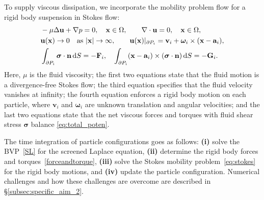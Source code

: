 To supply viscous dissipation, we incorporate the mobility problem
flow for a rigid body suspension in Stokes flow:
\begin{equation}
\label{eq:stokes}
\begin{aligned}
  &-\mu \Delta \mathbf{u} + \nabla p = 0, \quad \mathbf{x} \in \Omega, \qquad 
  \nabla \cdot \mathbf{u} = 0,  \quad \mathbf{x} \in \Omega,\\
  &{\bf u}(\mathbf{x}) \to 0 \quad \text{as}\ |\mathbf{x}|\to \infty,\qquad 
  \mathbf{u}(\mathbf{x})|_{\partial P_i} = \mathbf{v}_i +
\boldsymbol{\omega}_i\times(\mathbf{x} - \mathbf{a}_i),\\
&\int_{\partial P_i}\boldsymbol{\sigma}\cdot {\bf n} \dif S=-{\bf F}_i, \quad
\int_{\partial P_i} (\mathbf{x} - \mathbf{a}_i)\times (\boldsymbol{\sigma} \cdot \mathbf{n}) \dif S =-{\bf G}_i.
\end{aligned}
\end{equation}
Here, $\mu$ is the fluid viscosity; the first two equations state that
the fluid motion is a divergence-free Stokes flow; the third equation
specifies that the fluid velocity vanishes at infinity; the fourth
equation enforces a rigid body motion on each particle, where
$\mathbf{v}_i$ and $\boldsymbol{\omega}_i$ are unknown translation and
angular velocities; and the last two equations state that the net
viscous forces and torques with fluid shear stress $\boldsymbol{\sigma}$
balance \eqref{eq:total_poten}.


The time integration of particle configurations goes as follows:
\textbf{(i)} solve the BVP~\eqref{SL} for the screened Laplace equation,
\textbf{(ii)} determine the rigid body forces and
torques~\eqref{forceandtorque}, \textbf{(iii)} solve the Stokes mobility
problem~\eqref{eq:stokes} for the rigid body motions, and \textbf{(iv)}
update the particle configuration.  Numerical challenges and how these
challenges are overcome are described in \S\ref{subsec:specific_aim_2}.


